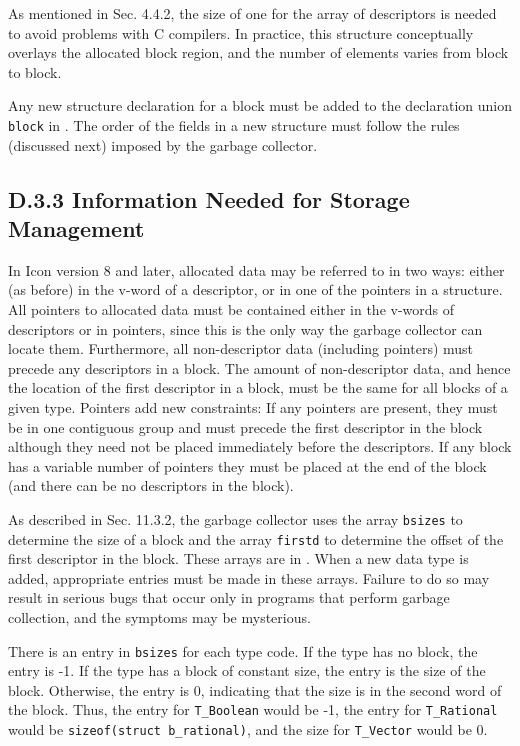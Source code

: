 \noindent
As mentioned in Sec. 4.4.2, the size of one for the array of
descriptors is needed to avoid problems with C compilers.  In
practice, this structure conceptually overlays the allocated block
region, and the number of elements varies from block to block.

Any new structure declaration for a block must be added to the declaration
union \texttt{block} in . The order of the fields in a
new structure must follow the rules (discussed next) imposed by the garbage
collector.

\subsection[D.3.3 Information Needed for Storage Management]%
           {D.3.3 Information Needed for Storage Management}

In Icon version 8 and later, allocated data may be referred to in two ways:
either (as before) in the v-word of a descriptor, or in one of the pointers
in a structure.  All pointers to allocated data must be contained either in
the v-words of descriptors or in pointers, since this is the only way the
garbage collector can locate them. Furthermore, all non-descriptor data
(including pointers) must precede any descriptors in a block. The amount of
non-descriptor data, and hence the location of the first descriptor in a
block, must be the same for all blocks of a given type. Pointers add new
constraints: If any pointers are present, they must be in one contiguous
group and must precede the first descriptor in the block although they need
not be placed immediately before the descriptors.  If any block has a
variable number of pointers they must be placed at the end of the block
(and there can be no descriptors in the block).

As described in Sec. 11.3.2, the garbage collector uses the array
\texttt{bsizes} to determine the size of a block and the array
\texttt{firstd} to determine the offset of the first descriptor in the
block. These arrays are in . When a new data type is
added, appropriate entries must be made in these arrays. Failure to do so
may result in serious bugs that occur only in programs that perform garbage
collection, and the symptoms may be mysterious.

There is an entry in \texttt{bsizes} for each type code. If the type has no
block, the entry is -1. If the type has a block of constant size, the entry
is the size of the block. Otherwise, the entry is 0, indicating that the
size is in the second word of the block. Thus, the entry for
\texttt{T\_Boolean} would be -1, the entry for \texttt{T\_Rational} would
be \texttt{sizeof(struct b\_rational)}, and the size for \texttt{T\_Vector}
would be 0.

